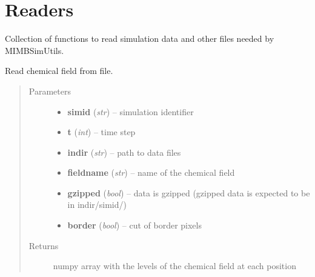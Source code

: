 \documentclass[letterpaper,10pt,english]{sphinxmanual}
\begin{document}
\chapter{Readers}
\label{Readers::doc}\label{Readers:readers}
Collection of functions to read simulation data and other files needed by MIMBSimUtils.
\label{Readers:module-Readers}

\begin{fulllineitems}
\label{Readers:Readers.readChemField}
Read chemical field from file.
\begin{quote}\begin{description}
\item[{Parameters}] \leavevmode\begin{itemize}
\item {} 
\textbf{simid} (\emph{str}) -- simulation identifier

\item {} 
\textbf{t} (\emph{int}) -- time step

\item {} 
\textbf{indir} (\emph{str}) -- path to data files

\item {} 
\textbf{fieldname} (\emph{str}) -- name of the chemical field

\item {} 
\textbf{gzipped} (\emph{bool}) -- data is gzipped (gzipped data is expected to be in indir/simid/)

\item {} 
\textbf{border} (\emph{bool}) -- cut of border pixels

\end{itemize}

\item[{Returns}] \leavevmode
numpy array with the levels of the chemical field at each position

\end{description}\end{quote}

\end{fulllineitems}

\end{document}
